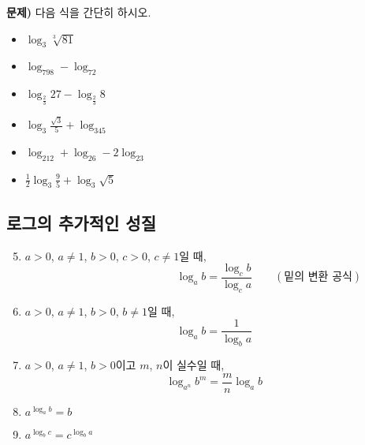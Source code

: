 \documentclass[a4paper,twocolumn]{article}
\begin{document}
\textbf{문제)} 다음 식을 간단히 하시오.
\begin{itemize}\label{prop5}
\item
\(\log_3\sqrt[3]{81}\)
\item
\(\log_798-\log_72\)
\item
\(\log_{\frac23}27-\log_{\frac23}8\)
\item
\(\log_3{\frac{\sqrt3}5}+\log_345\)
\item
\(\log_212+\log_26-2\log_23\)
\item
\(\frac12\log_3\frac95+\log_3\sqrt5\)
\end{itemize}

%
\subsection{로그의 추가적인 성질}
\begin{enumerate}[(1)]
\setcounter{enumi}{4}
\item
\(a>0\), \(a\neq1\), \(b>0\), \(c>0\), \(c\neq1\)일 때,
\[\phantom{\qquad(\text{밑의 변환 공식})}\log_ab=\frac{\log_cb}{\log_ca}\qquad(\text{밑의 변환 공식})\]
\item
\(a>0\), \(a\neq1\), \(b>0\), \(b\neq1\)일 때,
\[\log_ab=\frac1{\log_ba}\]
\item
\(a>0\), \(a\neq1\), \(b>0\)이고 \(m\), \(n\)이 실수일 때,
\[\log_{a^n}{b^m}=\frac mn \log_ab\]
\item
\(\displaystyle a^{\log_ab}=b\)
\item
\(\displaystyle a^{\log_bc}=c^{\log_ba}\)

\end{enumerate}
\end{document}
